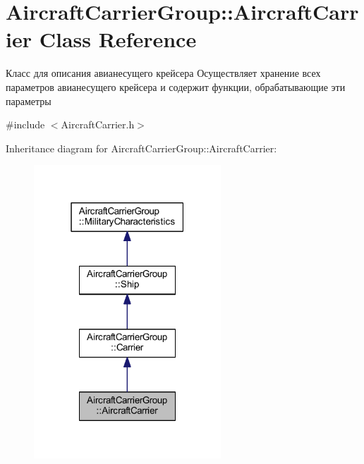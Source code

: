 \hypertarget{class_aircraft_carrier_group_1_1_aircraft_carrier}{}\section{Aircraft\+Carrier\+Group\+:\+:Aircraft\+Carrier Class Reference}
\label{class_aircraft_carrier_group_1_1_aircraft_carrier}


Класс для описания авианесущего крейсера  Осуществляет хранение всех параметров авианесущего крейсера и содержит функции, обрабатывающие эти параметры  




{\ttfamily \#include $<$Aircraft\+Carrier.\+h$>$}



Inheritance diagram for Aircraft\+Carrier\+Group\+:\+:Aircraft\+Carrier\+:
\nopagebreak
\begin{figure}[H]
\begin{center}
\leavevmode
\includegraphics[width=199pt]{class_aircraft_carrier_group_1_1_aircraft_carrier__inherit__graph}
\end{center}
\end{figure}



